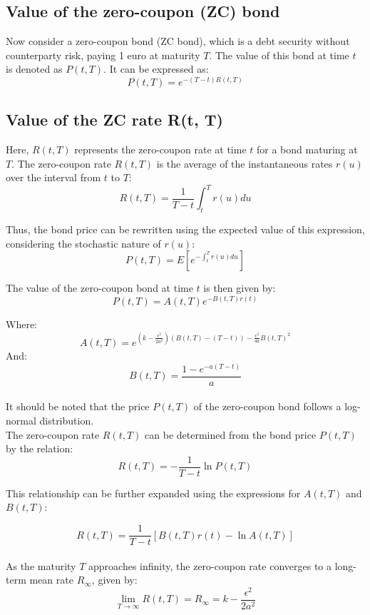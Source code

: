 \documentclass[a4paper,10pt]{article}
\begin{document}
\subsection{Value of the zero-coupon (ZC) bond}

\noindent Now consider a zero-coupon bond (ZC bond), which is a debt security without counterparty risk, paying 1 euro at maturity \( T \). The value of this bond at time \( t \) is denoted as \( P(t, T) \). It can be expressed as:
\[P(t, T) = e^{-(T-t)R(t,T)}\]

\subsection{Value of the ZC rate R(t, T)}

\noindent Here, \( R(t, T) \) represents the zero-coupon rate at time \( t \) for a bond maturing at \( T \). The zero-coupon rate \( R(t, T) \) is the average of the instantaneous rates \( r(u) \) over the interval from \( t \) to \( T \):
\[R(t, T) = \frac{1}{T - t} \int_{t}^{T} r(u) du\]

\noindent Thus, the bond price can be rewritten using the expected value of this expression, considering the stochastic nature of \( r(u) \):
\[P(t, T) = E\left[ e^{-\int_{t}^{T} r(u) du} \right]\]

\noindent The value of the zero-coupon bond at time \( t \) is then given by: 
\[P(t, T) = A(t, T)e^{-B(t,T)r(t)}\]

\noindent Where:
\[A(t, T) = e^{\left(k - \frac{\epsilon^2}{2a^2}\right)\left(B(t,T) - (T-t)\right) - \frac{\epsilon^2}{4a} B(t,T)^2}\]
\noindent And:
\[B(t, T) = \frac{1 - e^{-a(T-t)}}{a}\]\\

\noindent It should be noted that the price \( P(t, T) \) of the zero-coupon bond follows a log-normal distribution. \\

\noindent The zero-coupon rate \( R(t, T) \) can be determined from the bond price \( P(t, T) \) by the relation: 
\[R(t, T) = -\frac{1}{T - t} \ln P(t, T)\]

\noindent This relationship can be further expanded using the expressions for \( A(t, T) \) and \( B(t, T) \): 

\[R(t, T) = \frac{1}{T - t} \left[B(t, T)r(t) - \ln A(t, T)\right]\]\\

\noindent As the maturity \( T \) approaches infinity, the zero-coupon rate converges to a long-term mean rate \( R_\infty \), given by: 
\[\lim_{T \to \infty} R(t, T) = R_\infty = k - \frac{\epsilon^2}{2a^2}\]
\end{document}

